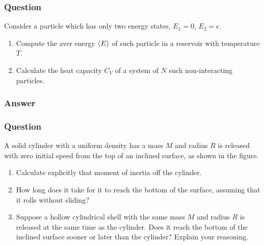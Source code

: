 \subsubsection{Question}
Consider a particle which has only two energy states, $E_1 = 0$, $E_2 = \epsilon$.
\begin{enumerate}
	\item Compute the aver energy $\expval{E}$ of such particle in a reservoir with temperature $T$.
	\item Calculate the heat capacity $C_V$ of a system of $N$ such non-interacting particles.
\end{enumerate}
\subsubsection{Answer}


\subsubsection{Question}
A solid cylinder with a uniform density has a mass $M$ and radius $R$ is released with zero initial speed from the top of an inclined surface, as shown in the figure. 
\begin{enumerate}
	\item Calculate explicitly that moment of inertia off the cylinder.
	\item How long does it take for it to reach the bottom of the surface, assuming that it rolls without sliding?
	\item Suppose a hollow cylindrical shell with the same mass $M$ and radius $R$ is released at the same time as the cylinder. Does it reach the bottom of the inclined surface sooner or later than the cylinder? Explain your reasoning.
\end{enumerate}
